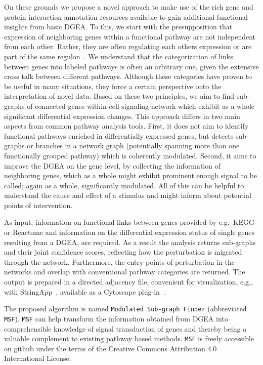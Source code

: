 \documentclass[10pt,a4paper,twocolumn]{article}
\begin{document}
On these grounds we propose a novel approach to make use of the rich gene
and protein interaction annotation resources available to gain additional
functional insights from basic DGEA. To this, we start with the
presupposition that expression of neighboring genes within a functional
pathway are not independent from each other. Rather, they are often
regulating each others expression or are part of the same
regulon~\cite{Michalak}. We understand that the categorization of links
between genes into labeled pathways is often an arbitrary one, given the
extensive cross talk between different pathways. Although these categories
have proven to be useful in many situations, they force a certain
perspective onto the interpretation of novel data. Based on these two
principles, we aim to find sub-graphs of connected genes within cell
signaling network which exhibit as a whole significant differential
expression changes. This approach differs in two main aspects from common
pathway analysis tools. First, it does not aim to identify functional
pathways enriched in differentially expressed genes, but detects sub-graphs
or branches in a network graph (potentially spanning more than one
functionally grouped pathway) which is coherently modulated. Second, it
aims to improve the DGEA on the gene level, by collecting the information
of neighboring genes, which as a whole might exhibit prominent enough
signal to be called; again as a whole, significantly modulated. All of this can be helpful to understand the cause and effect of a stimulus and might inform about potential points of intervention.

As input, information on functional links between genes provided by
e.g.~KEGG or Reactome and information on the differential expression status
of single genes resulting from a DGEA, are required. As a result the
analysis returns sub-graphs and their joint confidence scores, reflecting
how the perturbation is migrated through the network. Furthermore, the
entry points of perturbation in the networks and overlap with conventional
pathway categories are returned. The output is prepared in a directed
adjacency file, convenient for visualization, e.g., with
StringApp~\cite{StringApp}, available as a Cytoscape plug-in~\cite{Cyto}.

 The proposed algorithm is named
\texttt{Modulated Sub-graph Finder} (abbreviated
\texttt{MSF}). \texttt{MSF} can help transform the information obtained
from DGEA into comprehensible knowledge of signal transduction of genes and
thereby being a valuable complement to existing pathway based
methods.  \texttt{MSF} is freely accessible on github under the terms of the
Creative Commons Attribution 4.0 International License.
\end{document}
